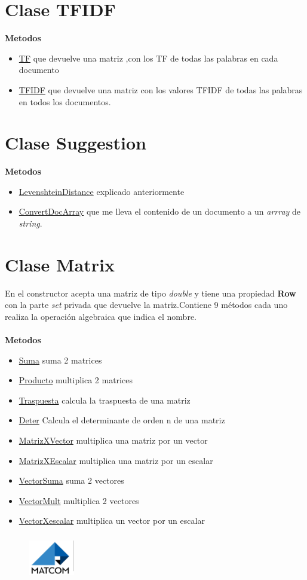 \documentclass[a4paper,12pt]{article}
\begin{document}
\section{Clase TFIDF}
\large\textbf{Metodos}
\begin{itemize}
  \item \underline{TF} que devuelve una matriz ,con los TF de todas las palabras en cada
  documento
  \item \underline{TFIDF} que devuelve una matriz con los valores TFIDF de todas las
  palabras en todos los documentos.
\end{itemize}
\section{Clase Suggestion}
\large\textbf{Metodos}
\begin{itemize}
    \item \underline{LevenshteinDistance} explicado anteriormente
    \item \underline{ConvertDocArray} que me lleva el contenido de un documento a un
    \textit{arrray } de \textit{string}.
\end{itemize}
\section{Clase Matrix}
En el constructor acepta una matriz de tipo \textit{double} y tiene una
propiedad \textbf{Row} con la parte \textit{set} privada que devuelve la matriz.Contiene
9 métodos cada uno realiza la operación algebraica que indica el nombre. \\ \\
\large\textbf{Metodos}
\begin{itemize}
    \item \underline{Suma} suma 2 matrices
    \item \underline{Producto} multiplica 2 matrices
    \item \underline{Traspuesta} calcula la traspuesta de una matriz
    \item \underline{Deter} Calcula el determinante de orden n de una matriz
    \item \underline{MatrizXVector} multiplica una matriz por un vector
    \item \underline{MatrizXEscalar} multiplica una matriz por un escalar
    \item \underline{VectorSuma} suma 2 vectores
    \item \underline{VectorMult} multiplica 2 vectores
    \item \underline{VectorXescalar} multiplica un vector por un escalar
\end{itemize}
\begin{figure}[t]
    \hspace{13cm}
\includegraphics[width=2cm,height=2cm]{Logo de Matcom.png}
\end{figure}
\end{document}
